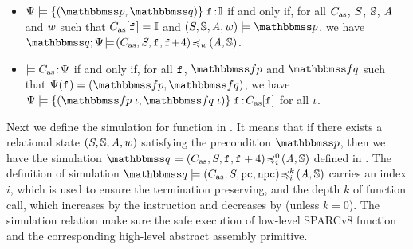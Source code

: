 \begin{definition}
	\em
	\label{def:soundness of instruction sequence}
    \mbox{}
    \begin{itemize}
    \item $\semwfseqrel{\Cspec}{\relastP}{\relastQ}{\cblk}$ if and only if, for all
    $C_{\text{as}}$, $S$, $\mathbb{S}$, $\textit{A}$ and $w$ 
    such that $C_{\text{as}}[\texttt{f}_{}] = \mathbb{I}$
    and $(\state, \hpstate, \primcom, \word) \models \relastP$, we have
    $\simInsSeq{\relastQ}{\Cspec}
        {(\asmimp, \state, \lab{}, \lab{}\!+\!4)}{\word}{(\primcom, \hpstate)}$. 
    \item
    $\models C_{\text{as}} \!:\! \Psi$ if and only if, for all
    $\texttt{f}_{}$, $\relspecpre$ and $\relspecpost$ %
    such that $\Cspec(\lab{}) = (\relspecpre, \relspecpost)$,
    we have $\semwfseqrel{\Cspec}{\relspecpre \; \lgvl}{\relspecpost \; \lgvl}{\asmimp[\lab{}]}$
    for all $\iota$.
    \end{itemize}
\end{definition}

Next we define the simulation for function in 
\Def{\ref{def:simfunc}}. It means that if there 
exists a relational state $(S, \mathbb{S}, \textit{A}, w)$ 
satisfying the precondition $\relastP$, then we have 
the simulation 
$\simFunctionSt{\relastQ}{(\asmimp, \state, \lab{}, \lab{} + 4)}
    {i}{0}{(\primcom, \hpstate)}$ defined in 
\Def{\ref{def:sim-imp-prim-state}}.
The definition of simulation 
$\simFunctionSt{\relastQ}{(\asmimp, \state, \pc, \npc)}
    {i}{k}{(\primcom, \hpstate)}$ carries an index $i$, 
which is used to ensure the termination preserving, 
and the depth $k$ of function call, which  
increases by the \call{} instruction
and decreases by \retl{} (unless $k=0$). 
The simulation relation make sure 
the safe execution of low-level SPARCv8 function  
and the corresponding high-level abstract assembly primitive.

